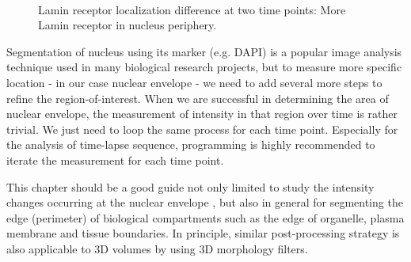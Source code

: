 \begin{figure}[!ht]
 \centering
 \quad
  \\
 \caption{Lamin receptor localization difference at two time points: More Lamin receptor in nucleus periphery. }
 \label{fig:NucStrategy}
\end{figure}

Segmentation of nucleus using its marker (e.g. DAPI) is a popular image analysis technique used in many biological research projects, but to measure more specific location - in our case nuclear envelope - we need to add several more steps to refine the region-of-interest. When we are successful in determining the area of nuclear envelope, the measurement of intensity in that region over time is rather trivial. We just need to loop the same process for each time point. Especially for the analysis of time-lapse sequence, programming is highly recommended to iterate the measurement for each time point. 

This chapter should be a good guide not only limited to study the intensity changes occurring at the nuclear envelope , but also in general for segmenting the edge (perimeter) of biological compartments such as the edge of organelle, plasma membrane and tissue boundaries. In principle, similar post-processing strategy is also applicable to 3D volumes by using 3D morphology filters. 

